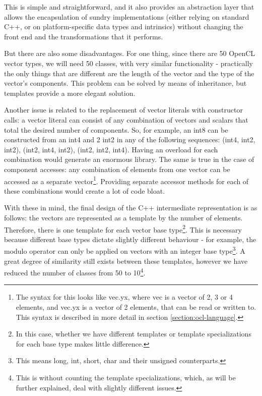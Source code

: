 This is simple and straightforward, and it also provides an abstraction layer that allows the encapsulation of sundry implementations (either relying on standard C++, or on platform-specific data types and intrinsics) without changing the front end and the transformations that it performs.

But there are also some disadvantages. For one thing, since there are 50 OpenCL vector types, we will need 50 classes, with very similar functionality - practically the only things that are different are the length of the vector and the type of the vector's components. This problem can be solved by means of inheritance, but templates provide a more elegant solution.

Another issue is related to the replacement of vector literals with constructor calls: a vector literal can consist of any combination of vectors and scalars that total the desired number of components. So, for example, an int8 can be constructed from an int4 and 2 int2 in any of the following sequences: (int4, int2, int2), (int2, int4, int2), (int2, int2, int4). Having an overload for each combination would generate an enormous library. The same is true in the case of component accesses: any combination of elements from one vector can be accessed as a separate vector\footnote{The syntax for this looks like vec.yx, where vec is a vector of 2, 3 or 4 elements, and vec.yx is a vector of 2 elements, that can be read or written to. This syntax is described in more detail in section \ref{section:ocl-language}.}. Providing separate accessor methods for each of these combinations would create a lot of code bloat.

With these in mind, the final design of the C++ intermediate representation is as follows: the vectors are represented as a template by the number of elements. Therefore, there is one template for each vector base type\footnote{In this case, whether we have different templates or template specializations for each base type makes little difference.}. This is necessary because different base types dictate slightly different behaviour - for example, the modulo operator can only be applied on vectors with an integer base type\footnote{This means long, int, short, char and their unsigned counterparts.}. A great degree of similarity still exists between these templates, however we have reduced the number of classes from 50 to 10\footnote{This is without counting the template specializations, which, as will be further explained, deal with slightly different issues.}.

